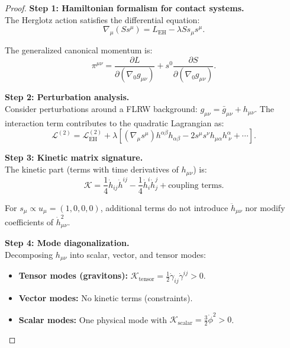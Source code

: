 \documentclass[11pt, a4paper]{article}
\theoremstyle{plain}
\theoremstyle{definition}
\begin{document}
\begin{proof}
\textbf{Step 1: Hamiltonian formalism for contact systems.} \\
The Herglotz action satisfies the differential equation:
\begin{equation}
\nabla_\mu(S s^\mu) = L_{\text{EH}} - \lambda S s_\mu s^\mu.
\end{equation}

The generalized canonical momentum is:
\begin{equation}
\pi^{\mu\nu} = \frac{\partial L}{\partial (\nabla_0 g_{\mu\nu})} + s^0 \frac{\partial S}{\partial (\nabla_0 g_{\mu\nu})}.
\end{equation}

\textbf{Step 2: Perturbation analysis.} \\
Consider perturbations around a FLRW background: $g_{\mu\nu} = \bar{g}_{\mu\nu} + h_{\mu\nu}$. The interaction term contributes to the quadratic Lagrangian as:
\begin{equation}
\mathcal{L}^{(2)} = \mathcal{L}_{\text{EH}}^{(2)} + \lambda \left[(\nabla_\mu s^\mu) h^{\alpha\beta}h_{\alpha\beta} - 2 s^\mu s^\nu h_{\mu\alpha}h^\alpha_{\ \nu} + \cdots\right].
\end{equation}

\textbf{Step 3: Kinetic matrix signature.} \\
The kinetic part (terms with time derivatives of $h_{\mu\nu}$) is:
\begin{equation}
\mathcal{K} = \frac{1}{4} \dot{h}_{ij}\dot{h}^{ij} - \frac{1}{4} \dot{h}^i_i \dot{h}^j_j + \text{coupling terms}.
\end{equation}

For $s_\mu \propto u_\mu = (1,0,0,0)$, additional terms do not introduce $\ddot{h}_{\mu\nu}$ nor modify coefficients of $\dot{h}_{\mu\nu}^2$.

\textbf{Step 4: Mode diagonalization.} \\
Decomposing $h_{\mu\nu}$ into scalar, vector, and tensor modes:
\begin{itemize}
    \item \textbf{Tensor modes (gravitons):} $\mathcal{K}_{\text{tensor}} = \frac{1}{2} \dot{\gamma}_{ij}\dot{\gamma}^{ij} > 0$.
    \item \textbf{Vector modes:} No kinetic terms (constraints).
    \item \textbf{Scalar modes:} One physical mode with $\mathcal{K}_{\text{scalar}} = \frac{3}{2} \dot{\phi}^2 > 0$.
\end{itemize}


\end{proof}
\end{document}

